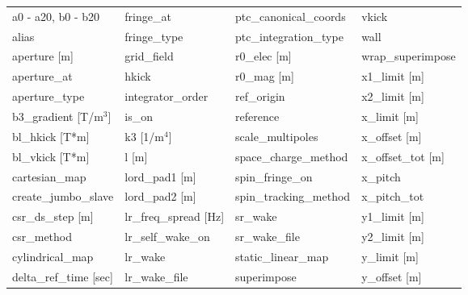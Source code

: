  \begin{tabular}{llll} \toprule
a0 - a20, b0 - b20               & fringe_at                        & ptc_canonical_coords             & vkick                            \\
alias                            & fringe_type                      & ptc_integration_type             & wall                             \\
aperture [m]                     & grid_field                       & r0_elec [m]                      & wrap_superimpose                 \\
aperture_at                      & hkick                            & r0_mag [m]                       & x1_limit [m]                     \\
aperture_type                    & integrator_order                 & ref_origin                       & x2_limit [m]                     \\
b3_gradient [T/m$^3$]            & is_on                            & reference                        & x_limit [m]                      \\
bl_hkick [T*m]                   & k3 [1/m$^4$]                     & scale_multipoles                 & x_offset [m]                     \\
bl_vkick [T*m]                   & l [m]                            & space_charge_method              & x_offset_tot [m]                 \\
cartesian_map                    & lord_pad1 [m]                    & spin_fringe_on                   & x_pitch                          \\
create_jumbo_slave               & lord_pad2 [m]                    & spin_tracking_method             & x_pitch_tot                      \\
csr_ds_step [m]                  & lr_freq_spread [Hz]              & sr_wake                          & y1_limit [m]                     \\
csr_method                       & lr_self_wake_on                  & sr_wake_file                     & y2_limit [m]                     \\
cylindrical_map                  & lr_wake                          & static_linear_map                & y_limit [m]                      \\
delta_ref_time [sec]             & lr_wake_file                     & superimpose                      & y_offset [m]                     \\

\end{tabular}
